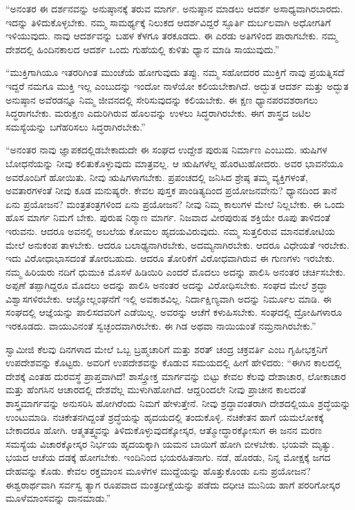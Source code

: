 “ಅನಂತರ ಈ ದರ್ಶನವನ್ನು ಅನುಷ್ಠಾನಕ್ಕೆ ತರುವ ಮಾರ್ಗ. ಅನುಷ್ಠಾನ ಮಾಡಲು ಆದರ್ಶ ಅಸಾಧ್ಯವಾಗಿರಬಾರದು. ಇದನ್ನು ತಿಳಿದುಕೊಳ್ಳಬೇಕು. ನಮ್ಮ ಸಾಮರ್ಥ್ಯಕ್ಕೆ ನಿಲುಕದ ಆದರ್ಶವಿದ್ದರೆ ಸ್ಫೂರ್ತಿ ದುರ್ಬಲವಾಗಿ ಅಧೋಗತಿಗೆ ಇಳಿಯುವುದು. ನಾವು ಆದರ್ಶವನ್ನು ಬಹಳ ಕೆಳಗೂ ತರಕೂಡದು. ಈ ಎರಡು ಅತಿಗಳಿಂದ ಪಾರಾಗಬೇಕು. ನಮ್ಮ ದೇಶದಲ್ಲಿ ಹಿಂದಿನಕಾಲದ ಆದರ್ಶ ಒಂದು ಗುಹೆಯಲ್ಲಿ ಕುಳಿತು ಧ್ಯಾನ ಮಾಡಿ ಸಾಯುವುದು.” 

 “ಮುಕ್ತಿಗಾಗಿಯೂ ಇತರರಿಗಿಂತ ಮುಂಚೆಯೆ ಹೋಗುವುದು ತಪ್ಪು. ನಮ್ಮ ಸಹೋದರರ ಮುಕ್ತಿಗೆ ನಾವು ಪ್ರಯತ್ನಿಸದೆ ಇದ್ದರೆ ನಮಗೂ ಮುಕ್ತಿ ಇಲ್ಲ ಎಂಬುದನ್ನು ಇಂದೋ ನಾಳೆಯೋ‌ ಕಲಿಯಬೇಕಾಗಿದೆ. ಅದ್ಭುತ ಆದರ್ಶ ಮತ್ತು ಅದ್ಭುತ ಅನುಷ್ಠಾನ ಅವೆರಡನ್ನೂ ನಿಮ್ಮ ಜೀವನದಲ್ಲಿ ಸೇರಿಸುವುದನ್ನು ಕಲಿಯಬೇಕು. ಈ ಕ್ಷಣ ಧ್ಯಾನಪರವಶರಾಗಲು ಸಿದ್ಧರಾಗಬೇಕು. ಮರುಕ್ಷಣ ಎದುರಿಗಿರುವ ಹೊಲವನ್ನು ಉಳಲು ಸಿದ್ಧರಾಗಿರಬೇಕು. ಈಗ ಶಾಸ್ತ್ರದ ಜಟಿಲ ಸಮಸ್ಯೆಯನ್ನು ಬಗೆಹರಿಸಲು ಸಿದ್ಧರಾಗಿರಬೇಕು.” 

 “ಅನಂತರ ನಾವು ಜ್ಞಾಪಕದಲ್ಲಿಡಬೇಕಾದುದೇ ಈ ಸಂಘದ ಉದ್ದೇಶ ಪುರುಷ ನಿರ್ಮಾಣ ಎಂಬುದು. ಋಷಿಗಳ ಬೋಧನೆಯನ್ನು ನೀವು ಕಲಿತುಕೊಳ್ಳುವುದು ಮಾತ್ರವಲ್ಲ. ಆ ಋಷಿಗಳೆಲ್ಲ ಹೊರಟುಹೋದರು. ಅವರ ಭಾವನೆಯೂ ಅವರೊಂದಿಗೆ ಹೋಯಿತು. ನೀವು ಋಷಿಗಳಾಗಬೇಕು. ಪ್ರಪಂಚದಲ್ಲಿ ಜನಿಸಿದ ಶ್ರೇಷ್ಠ ತಮ್ಮ ವ್ಯಕ್ತಿಗಳಂತೆ, ಅವತಾರಗಳಂತೆ ನೀವು ಕೂಡ ಮನುಷ್ಯರೇ. ಕೇವಲ ಪುಸ್ತಕ ಪಾಂಡಿತ್ಯದಿಂದ ಪ್ರಯೋಜನವೇನು? ಧ್ಯಾನದಿಂದ ತಾನೆ ಏನು ಪ್ರಯೋಜನ? ಮಂತ್ರತಂತ್ರಗಳಿಂದ ಏನು ಪ್ರಯೋಜನ? ನೀವು ನಿಮ್ಮ ಕಾಲುಗಳ ಮೇಲೆ ನಿಲ್ಲಬೇಕು. ಈ ಒಂದು ಹೊಸ ಮಾರ್ಗ ನಿಮಗೆ ಬೇಕು. ಪುರುಷ ನಿರ‍್ಮಾಣ ಮಾರ್ಗ. ನಿಜವಾದ ವೀರಪುರುಷ ಶಕ್ತಿಯೇ ರೂಪು ತಾಳಿದಂತೆ ಇರುವನು. ಆದರೂ ಅವನಲ್ಲಿ ಅಬಲೆಯ ಕೋಮಲ ಹೃದಯವಿರುವುದು. ನಮ್ಮ ಸುತ್ತಲಿರುವ ಮಾನವಕೋಟಿಯ ಮೇಲೆ ಅನುಕಂಪ ತಾಳಬೇಕು. ಆದರೂ ಬಲಾಢ್ಯನಾಗಿರಬೇಕು, ಅದಮ್ಯನಾಗಿರಬೇಕು. ಆದರೂ ವಿಧೇಯತೆ ಇರಬೇಕು. ಇದು ವಿರೋಧಾಭಾಸದಂತೆ ತೋರಬಹುದು. ಆದರೂ ತೋರಿಕೆಗೆ ವಿರೋಧವಾಗಿರುವ ಈ ಗುಣಗಳು ಇರಬೇಕು. ನಮ್ಮ ಹಿರಿಯರು ನದಿಗೆ ಧುಮುಕಿ ಮೊಸಳೆ ಹಿಡಿಯಿರಿ ಎಂದರೆ ಮೊದಲು ಅದನ್ನು ಪಾಲಿಸಿ ಅನಂತರ ಚರ್ಚಿಸಬೇಕು. ಅಪ್ಪಣೆ ತಪ್ಪಾಗಿದ್ದರೂ ಮೊದಲು ಅದನ್ನು ಪಾಲಿಸಿ ಅನಂತರ ಅದನ್ನು ವಿರೋಧಿಸಬೇಕು. ಸಂಘದ ಮೇಲೆ ಶ್ರದ್ಧಾ ವಿಶ್ವಾಸಗಳಿರಬೇಕು. ಆಜ್ಞೋಲ್ಲಂಘನೆಗೆ ಇಲ್ಲಿ ಅವಕಾಶವಿಲ್ಲ. ನಿರ್ದಾಕ್ಷಿಣ್ಯವಾಗಿ ಅದನ್ನು ನಿರ್ಮೂಲ ಮಾಡಿ. ಈ ಸಂಘದಲ್ಲಿ ಆಜ್ಞೆಯನ್ನು ಪಾಲಿಸದವರಿಗೆ ಎಡೆಯಿಲ್ಲ. ಅವರನ್ನು ಆಚೆಗೆ ಕಳುಹಿಸಬೇಕು. ಸಂಘದಲ್ಲಿ ದ್ರೋಹಿಗಳಾರೂ ಇರಕೂಡದು. ವಾಯುವಿನಂತೆ ಸ್ವಚ್ಛಂದವಾಗಿರಬೇಕು. ಈ ಗಿಡ ಅಥವಾ ನಾಯಿಯಂತೆ ನಮ್ರನಾಗಿರಬೇಕು.” 

 ಸ್ವಾಮೀಜಿ ಕೆಲವು ದಿನಗಳಾದ ಮೇಲೆ ಒಬ್ಬ ಬ್ರಹ್ಮಚಾರಿಗೆ ಮತ್ತು ಶರತ್ ಚಂದ್ರ ಚಕ್ರವರ್ತಿ ಎಂಬ ಗೃಹೀಭಕ್ತನಿಗೆ ಉಪದೇಶವನ್ನು ಕೊಟ್ಟರು. ಅವರಿಗೆ ಉಪದೇಶವನ್ನು ಕೊಡುವ ಸಮಯದಲ್ಲಿ ಹೀಗೆ ಹೇಳಿದರು: “ಈಗಿನ ಕಾಲದಲ್ಲಿ ದೇಶಕ್ಕೆ ಎಂತಹ ದುರವಸ್ಥೆ ಪ್ರಾಪ್ತವಾಗಿದೆ! ಶಾಸ್ತ್ರೋಕ್ತ ಮಾರ್ಗವನ್ನು ಬಿಟ್ಟು ಕೇವಲ ಕೆಲವು ದೇಶಾಚಾರ, ಲೋಕಾಚಾರ ಮತ್ತು ಹೆಂಗಸಿನ ಆಚಾರದಲ್ಲಿ ದೇಶವೆಲ್ಲ ಮುಳುಗಿಹೋಗಿದೆ. ಆದ್ದರಿಂದಲೇ ನೀವು ಪ್ರಾಚೀನ ಕಾಲದಂತೆ ಶಾಸ್ತ್ರಮಾರ್ಗವನ್ನು ಅನುಸರಿಸಿ ಹೋಗಿರೆಂದು ನಿಮಗೆ ಹೇಳುತ್ತೇನೆ. ನೀವು ಶ್ರದ್ಧಾವಂತರಾಗಿ ದೇಶದಲ್ಲಿಯೂ ಶ್ರದ್ಧೆಯನ್ನು ಉಂಟುಮಾಡಿ. ನಚಿಕೇತನಗಿದ್ದಂತೆ ಶ್ರದ್ಧೆಯನ್ನು ಹೃದಯದಲ್ಲಿ ತಂದುಕೊಳ್ಳಿ. ನಚಿಕೇತನ ಹಾಗೆ ಯಮಲೋಕಕ್ಕೆ ಬೇಕಾದರೂ ಹೋಗಿ. ಆತ್ಮತತ್ತ್ವವನ್ನು ತಿಳಿದುಕೊಳ್ಳುವುದಕ್ಕೋಸ್ಕರ, ಆತ್ಮೋದ್ಧಾರಕ್ಕೋಸುಗ ಈ ಜನನ ಮರಣ ಸಮಸ್ಯೆಯ ವಿಚಾರಕ್ಕೋಸ್ಕರ ನಿರ್ಭಯ ಹೃದಯಕ್ಕಾಗಿ ಯಮನ ಬಾಯಿಗೆ ಹೋಗಿ ಬೀಳಬೇಕು. ಭಯವೇ ಮೃತ್ಯು. ಭಯದ ಆಚೆಯ ದಡಕ್ಕೆ ಹೋಗಬೇಕು. ಇಂದಿನಿಂದ ಭಯರಹಿತನಾಗು. ನಡೆ, ಹೊರಡು, ನಿನ್ನ ಮೋಕ್ಷಕ್ಕೆ ಜಗದ ದೇಹವನ್ನು ಕೊಡು. ಕೇವಲ ರಕ್ತಮಾಂಸ ಮೂಳೆಗಳ ಮುದ್ದೆಯನ್ನು ಹೊತ್ತುಕೊಂಡು ಏನು ಪ್ರಯೋಜನ? ಈಶ್ವರಾರ್ಥವಾಗಿ ಸರ್ವಸ್ವ ತ್ಯಾಗ ರೂಪವಾದ ಮಂತ್ರದೀಕ್ಷೆಯನ್ನು ಪಡೆದು ದಧೀಚಿ ಮುನಿಯ ಹಾಗೆ ಪರರಿಗೋಸ್ಕರ ಮೂಳೆಮಾಂಸವನ್ನು ದಾನಮಾಡು.” 

